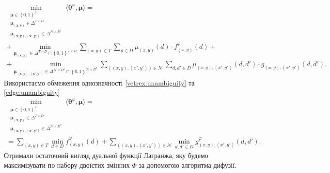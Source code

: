 \begin{equation*}
\begin{gathered}
    \min \limits_{\substack{\pmb{\mu} \in \left\{ 0, 1 \right\}^{\mathcal{I}} \\
                            \pmb{\mu_{\left(x, y \right)}} \in \Delta^{T \times D} \\
                            \pmb{\mu_{\left(x, y \right), \left(x', y' \right)}} \in
                                \Delta^{\mathcal{N} \times D^2}}}
        \langle \pmb{\theta}^{\varphi}, \pmb{\mu} \rangle = \\
    + \min \limits_{\pmb{\mu_{\left(x, y \right)}}\in \Delta^{T \times D} \cap \left\{0, 1 \right\}^{T \times D}}
        \sum \limits_{\left(x, y \right) \in T}
            \sum \limits_{d \in D}
                \mu_{\left(x, y \right)} \left( d \right) \cdot
                f_{\left(x, y \right)}^{\varphi} \left(d \right) + \\
    + \min \limits_{\pmb{\mu_{\left(x, y \right), \left(x', y' \right)}}\in \Delta^{\mathcal{N} \times D^2} \cap \left\{0, 1 \right\}^{\mathcal{N} \times D^2}}
        \sum \limits_{\left(\left(x, y \right), \left(x', y' \right) \right) \in \mathcal{N}}
            \sum \limits_{d, d' \in D}
                \mu_{\left(x, y \right), \left(x', y' \right)} \left(d, d' \right) \cdot
                g_{\left(x, y \right), \left(x', y' \right)} \left(d, d' \right).
\end{gathered}
\end{equation*}
Використаємо обмеження однозначності \eqref{vetrex:unambiguity} та
\eqref{edge:unambiguity}
\begin{equation} \label{lagrange:dual:MAP}
\begin{gathered}
    \min \limits_{\substack{\pmb{\mu} \in \left\{ 0, 1 \right\}^{\mathcal{I}} \\
                            \pmb{\mu_{\left(x, y \right)}} \in \Delta^{T \times D} \\
                            \pmb{\mu_{\left(x, y \right), \left(x', y' \right)}} \in
                                \Delta^{\mathcal{N} \times D^2}}}
        \langle \pmb{\theta}^{\varphi}, \pmb{\mu} \rangle = \\
    = \sum \limits_{\left(x, y \right) \in T}
        \min \limits_{d \in D}
            f_{\left(x, y \right)}^{\varphi} \left(d \right) +
    \sum \limits_{\left(\left(x, y \right), \left(x', y' \right) \right) \in \mathcal{N}}
        \min_{d, d' \in D} g_{\left(x, y \right), \left(x', y' \right)}^{\varphi} \left(d, d' \right).
\end{gathered}
\end{equation}
Отримали остаточний вигляд дуальної функції Лагранжа,
яку будемо максимізувати по набору двоїстих змінних $\Phi$
за допомогою алгоритма дифузії.

